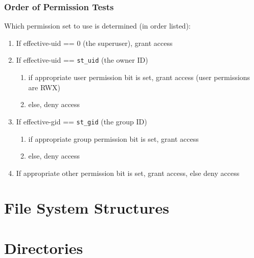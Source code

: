 \documentclass[newPxFont,sthlmFooter,nooffset]{beamer}
\begin{document}
\begin{frame}
  \frametitle{Order of Permission Tests}
Which permission set to use is determined (in order listed):
\begin{enumerate}
\item If effective-uid == 0 (the superuser), grant access
\item If effective-uid == \texttt{st\_uid} (the owner ID)
   \begin{enumerate}
   \item if appropriate user permission bit is set, grant access (user
     permissions are RWX)
   \item else, deny access
   \end{enumerate}
\item If effective-gid == \texttt{st\_gid} (the group ID)
   \begin{enumerate}
   \item if appropriate group permission bit is set, grant access
   \item else, deny access
   \end{enumerate}
\item If appropriate other permission bit is set, grant access, else deny access
\end{enumerate}
\end{frame}

\section{File System Structures}

\section{Directories}
\end{document}
